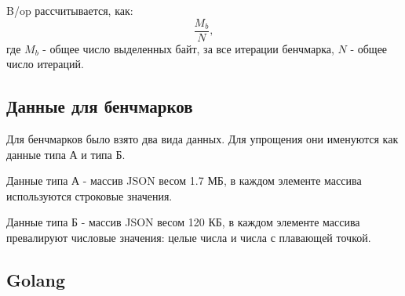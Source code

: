 B/op рассчитывается, как:
\begin{equation}
\dfrac{M_{b}}{N},
\end{equation}
где $M_{b}$ - общее число выделенных байт, за все итерации бенчмарка, $N$ - общее число итераций.  

\subsection{Данные для бенчмарков}

Для бенчмарков было взято два вида данных. Для упрощения они именуются как данные типа А и типа Б.

Данные типа А - массив JSON весом 1.7 МБ, в каждом элементе массива используются строковые значения.  

Данные типа Б - массив JSON весом 120 КБ, в каждом элементе массива превалируют числовые значения: целые числа и числа с плавающей точкой.  

\clearpage
\subsection{Golang}

